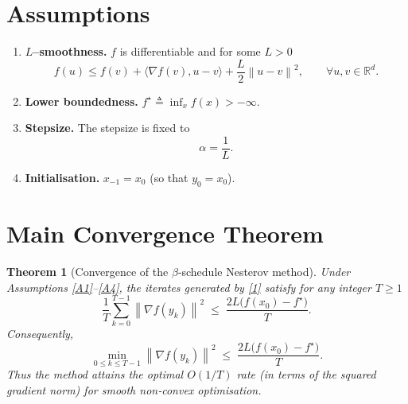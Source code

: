 \documentclass{article}
\newtheorem{theorem}{Theorem}
\newcommand{\grad}{\nabla}
\newcommand{\norm}[1]{\left\|#1\right\|}
\newcommand{\inner}[2]{\langle #1,#2\rangle}
\begin{document}
\section*{Assumptions}
\begin{enumerate}[label={\bf A\arabic*}.]
\item \label{A1} \textbf{$L$–smoothness.}  $f$ is differentiable and for some $L>0$
\[
f(u)\le f(v)+\inner{\grad f(v)}{u-v}+\frac{L}{2}\norm{u-v}^2,
\qquad\forall u,v\in\mathbb{R}^d .
\tag{A1}
\]
\item \label{A2} \textbf{Lower boundedness.} $f^\star\triangleq\inf_{x}f(x)>-\infty$.
\item \label{A3} \textbf{Stepsize.} The stepsize is fixed to
\[
\alpha=\frac{1}{L}.
\tag{A3}
\]
\item \label{A4} \textbf{Initialisation.} $x_{-1}=x_0$ (so that $y_0=x_0$).
\end{enumerate}

\section*{Main Convergence Theorem}
\begin{theorem}[Convergence of the $\beta$‑schedule Nesterov method]\label{thm:main}
Under Assumptions \ref{A1}–\ref{A4}, the iterates generated by \eqref{1} satisfy for any integer $T\ge1$
\[
\frac{1}{T}\sum_{k=0}^{T-1}\norm{\grad f(y_k)}^{2}
\;\le\;
\frac{2L\bigl(f(x_0)-f^\star\bigr)}{T}.
\tag{2}
\]
Consequently,
\[
\min_{0\le k\le T-1}\norm{\grad f(y_k)}^{2}
\;\le\;
\frac{2L\bigl(f(x_0)-f^\star\bigr)}{T}.
\tag{3}
\]
Thus the method attains the optimal $O(1/T)$ rate (in terms of the squared gradient norm) for smooth non‑convex optimisation.
\end{theorem}

\end{document}
